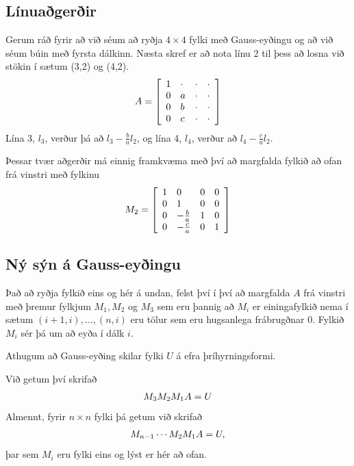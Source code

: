 \documentclass[letterpaper,10pt,icelandic]{sphinxmanual}
\begin{document}
\subsection{Línuaðgerðir}
\label{kafli08:linuagerir}
Gerum ráð fyrir að við séum að ryðja \(4\times 4\) fylki með
Gauss-eyðingu og að við séum búin með fyrsta dálkinn. Næsta skref er að
nota línu 2 til þess að losna við stökin í sætum (3,2) og (4,2).
\begin{gather}
\begin{split}A=
\left[\begin{array}{llll}
1 & \cdot & \cdot & \cdot\\
0 & a & \cdot & \cdot\\
0 & b & \cdot & \cdot\\
0 & c & \cdot & \cdot
\end{array}\right]\end{split}\notag
\end{gather}
Lína 3, \(l_3\), verður þá að \(l_3 - \frac ba l_2\), og
lína 4, \(l_4\), verður að \(l_4 - \frac ca l_2\).

Þessar tvær aðgerðir má einnig framkvæma með því að margfalda fylkið að
ofan frá vinstri með fylkinu
\begin{gather}
\begin{split}M_2 = \left[
\begin{array}{llll}
1 & 0 & 0 & 0\\
0 & 1 & 0 & 0\\
0 & -\frac ba & 1 & 0\\
0 & -\frac ca & 0 & 1
\end{array}
\right]\end{split}\notag
\end{gather}

\subsection{Ný sýn á Gauss-eyðingu}
\label{kafli08:ny-syn-a-gauss-eyingu}
Það að ryðja fylkið eins og hér á undan, felst því í því að margfalda
\(A\) frá vinstri með þremur fylkjum \(M_1, M_2\) og \(M_3\)
sem eru þannig að \(M_i\) er einingafylkið nema í sætum
\((i+1,i),\ldots,(n,i)\) eru tölur sem eru hugsanlega frábrugðnar 0.
Fylkið \(M_i\) sér þá um að eyða í dálk \(i\).

Athugum að Gauss-eyðing skilar fylki \(U\) á efra þríhyrningsformi.

Við getum því skrifað
\begin{gather}
\begin{split}M_3 M_2 M_1 A = U\end{split}\notag
\end{gather}
Almennt, fyrir \(n \times n\) fylki þá getum við skrifað
\begin{gather}
\begin{split}M_{n-1}\cdots M_2 M_1 A = U,\end{split}\notag
\end{gather}
þar sem \(M_i\) eru fylki eins og lýst er hér að ofan.
\end{document}
